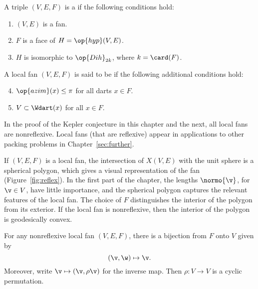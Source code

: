 \begin{definition} \label{def:convex-local}
A triple $(V,E,F)$ is a  if the following conditions hold:
\begin{enumerate} 
\item {} $(V,E)$ is a fan.
\item {} $F$ is a face of $H = \op{hyp}(V,E)$.
\item {} $H$ is isomorphic to $\op{Dih}_{2k}$, where $k =
\card(F)$.
\end{enumerate}
A local fan $(V,E,F)$ is said to be  if the following
additional conditions hold:
\begin{enumerate}
\setcounter{enumi}{3}
\item %
 $\op{azim}(x)\le \pi$ for all darts $x\in F$.
\item {} $V\subset \Wdart(x)$ for all $x\in F$.
\end{enumerate}
\end{definition}
%

In the proof of the Kepler conjecture in this chapter and the next,
all local fans are nonreflexive.  Local fans (that are reflexive) appear in
applications to other packing problems in Chapter~\ref{sec:further}.

\begin{remark}[visualization]\label{rem:visual}
  If $(V,E,F)$ is a local fan,
  the intersection of $X(V,E)$ with the unit sphere is a spherical
  polygon, which gives a visual representation of the fan (Figure~\ref{fig:reflex}).
  In the first part of the chapter, the lengths $\normo{\v}$, for $\v\in V$,
  have little importance, and the spherical polygon captures the relevant
  features of the local fan.
  The choice of $F$ distinguishes the interior of the polygon from its
  exterior.  If the local fan is nonreflexive, then the interior of the
  polygon is geodesically convex.
\end{remark}

\figFWYNFVS %


\begin{lemma}[]%
For any nonreflexive local fan $(V,E,F)$, there is a bijection from $F$ onto $V$
given by
\[ 
(\v,\w) \mapsto \v.
\] 
Moreover, write $\v\mapsto(\v,\rho\v)$ for the inverse map. 
Then $\rho:V\to V$ is a cyclic permutation.
\end{lemma}
%


